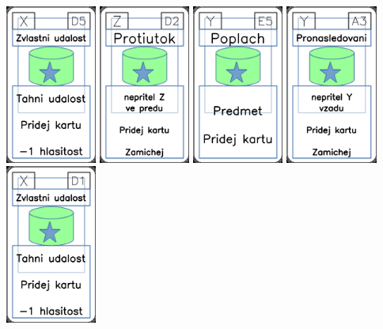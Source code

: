\documentclass[a4paper]{article}
\begin{document}
	\includegraphics[width=3.0cm]{img-5_19}
	\includegraphics[width=3.0cm]{img-5_46}
	\includegraphics[width=3.0cm]{img-5_24}
	\includegraphics[width=3.0cm]{img-5_32}
	\includegraphics[width=3.0cm]{img-5_15}
\end{document}
